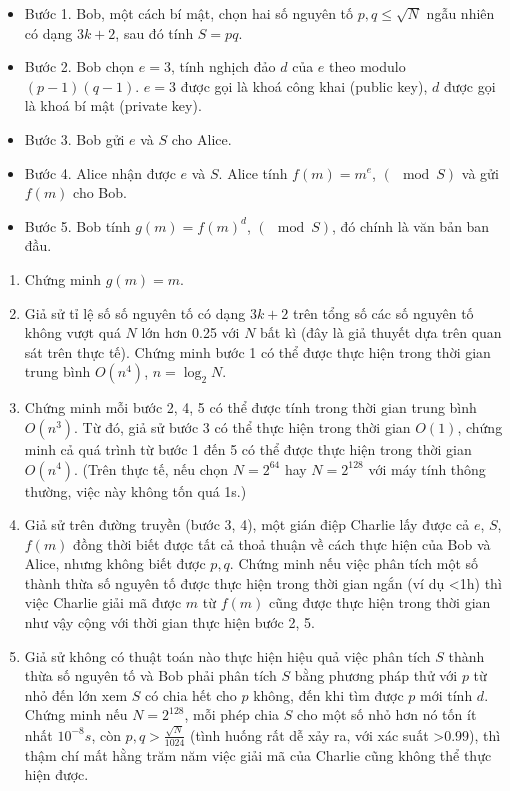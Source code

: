 \documentclass{article}
\begin{document}
\begin{itemize}
    \item Bước 1. Bob, một cách bí mật, chọn hai số nguyên tố $p, q \leq \sqrt{N}$ ngẫu nhiên có dạng $3k + 2$, sau đó tính $S = pq$.
    \item Bước 2. Bob chọn $e=3$, tính nghịch đảo $d$ của $e$ theo modulo $(p-1)(q-1)$. $e=3$ được gọi là khoá công khai (public key), $d$ được gọi là khoá bí mật (private key).
    \item Bước 3. Bob gửi $e$ và $S$ cho Alice.
    \item Bước 4. Alice nhận được $e$ và $S$. Alice tính $f(m) = m^e$, $(\mod S)$ và gửi $f(m)$ cho Bob.
    \item Bước 5. Bob tính $g(m) = f(m)^d$, $(\mod S)$, đó chính là văn bản ban đầu.
\end{itemize}

\begin{em}
    \begin{enumerate}
        \item Chứng minh $g(m) = m$.
        
        \item Giả sử tỉ lệ số số nguyên tố có dạng $3k+2$ trên tổng số các số nguyên tố không vượt quá $N$ lớn hơn 0.25 với $N$ bất kì (đây là giả thuyết dựa trên quan sát trên thực tế). Chứng minh bước 1 có thể được thực hiện trong thời gian trung bình $O(n^4)$, $n = \log_2 N$.
        
        \item Chứng minh mỗi bước 2, 4, 5 có thể được tính trong thời gian trung bình $O(n^3).$ Từ đó, giả sử bước 3 có thể thực hiện trong thời gian $O(1)$, chứng minh cả quá trình từ bước 1 đến 5 có thể được thực hiện trong thời gian $O(n^4)$. (Trên thực tế, nếu chọn $N = 2^{64}$ hay $N=2^{128}$ với máy tính thông thường, việc này không tốn quá 1s.)
        
        \item Giả sử trên đường truyền (bước 3, 4), một gián điệp Charlie lấy được cả $e$, $S$, $f(m)$ đồng thời biết được tất cả thoả thuận về cách thực hiện của Bob và Alice, nhưng không biết được $p, q$. Chứng minh nếu việc phân tích một số thành thừa số nguyên tố được thực hiện trong thời gian ngắn (ví dụ <1h) thì việc Charlie giải mã được $m$ từ $f(m)$ cũng được thực hiện trong thời gian như vậy cộng với thời gian thực hiện bước 2, 5.
        
        \item Giả sử không có thuật toán nào thực hiện hiệu quả việc phân tích $S$ thành thừa số nguyên tố và Bob phải phân tích $S$ bằng phương pháp thử với $p$ từ nhỏ đến lớn xem $S$ có chia hết cho $p$ không, đến khi tìm được $p$ mới tính $d$. Chứng minh nếu $N = 2^{128}$, mỗi phép chia $S$ cho một số nhỏ hơn nó tốn ít nhất $10^{-8}s$, còn $p,q > \frac{\sqrt{N}}{1024}$ (tình huống rất dễ xảy ra, với xác suất >0.99), thì thậm chí mất hằng trăm năm việc giải mã của Charlie cũng không thể thực hiện được.
        
    \end{enumerate}
\end{em}
\end{document}
